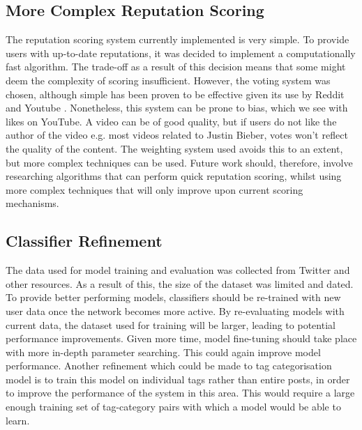\subsection{More Complex Reputation Scoring}
The reputation scoring system currently implemented is very simple. To provide users with up-to-date reputations, it was decided to implement a computationally fast algorithm. The trade-off as a result of this decision means that some might deem the complexity of scoring insufficient. However, the voting system was chosen, although simple has been proven to be effective given its use by Reddit and Youtube \cite{Reddit:About, Youtube:Home}. Nonetheless, this system can be prone to bias, which we see with likes on YouTube. A video can be of good quality, but if users do not like the author of the video e.g. most videos related to Justin Bieber, votes won't reflect the quality of the content. The weighting system used avoids this to an extent, but more complex techniques can be used. Future work should, therefore, involve researching algorithms that can perform quick reputation scoring, whilst using more complex techniques that will only improve upon current scoring mechanisms.

\subsection{Classifier Refinement}
The data used for model training and evaluation was collected from Twitter and other resources. As a result of this, the size of the dataset was limited and dated. To provide better performing models, classifiers should be re-trained with new user data once the network becomes more active. By re-evaluating models with current data, the dataset used for training will be larger, leading to potential performance improvements. Given more time, model fine-tuning should take place with more in-depth parameter searching. This could again improve model performance. Another refinement which could be made to tag categorisation model is to train this model on individual tags rather than entire posts, in order to improve the performance of the system in this area. This would require a large enough training set of tag-category pairs with which a model would be able to learn.


